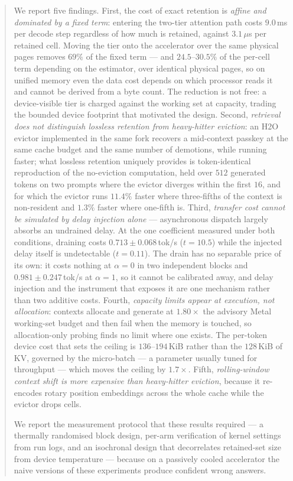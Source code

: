 \documentclass[manuscript,anonymous,review]{acmart}
\begin{document}
\begin{abstract}
We report five findings. First, the cost of exact retention is
\emph{affine and dominated by a fixed term}: entering the two-tier
attention path costs $9.0$\,ms per decode step regardless of how much
is retained, against $3.1\,\mu$s per retained cell. Moving the tier
onto the accelerator over the same physical pages removes $69\%$ of the
fixed term --- and $24.5$--$30.5\%$ of the per-cell term depending on
the estimator, over identical physical pages, so on unified memory even
the data cost depends on which processor reads it and cannot be derived
from a byte count. The reduction is not
free: a device-visible tier is charged against the working set at
capacity, trading the bounded device footprint that motivated the
design. Second, \emph{retrieval does not distinguish
lossless retention from heavy-hitter eviction}: an H2O evictor
implemented in the same fork recovers a mid-context passkey at the same cache
budget and the same number of demotions, while running faster; what
lossless retention uniquely provides is token-identical reproduction of
the no-eviction computation, held over $512$ generated tokens on two
prompts where the evictor diverges within the first $16$, and for which
the evictor runs $11.4\%$ faster
where three-fifths of the context is non-resident and $1.3\%$ faster
where one-fifth is. Third, \emph{transfer cost
cannot be simulated by delay injection alone} --- asynchronous
dispatch largely absorbs an undrained delay. At the one coefficient
measured under both conditions, draining costs $0.713 \pm 0.068$\,tok/s
($t = 10.5$) while the injected delay itself is undetectable
($t = 0.11$). The drain has no separable price of its own: it costs
nothing at $\alpha = 0$ in two independent blocks and $0.981 \pm
0.247$\,tok/s at $\alpha = 1$, so it cannot be calibrated away, and
delay injection and the instrument that exposes it are one mechanism
rather than two additive costs. Fourth, \emph{capacity limits appear
at execution, not allocation}: contexts allocate and generate at
$1.80\times$ the advisory Metal working-set budget and then fail when
the memory is touched, so allocation-only probing finds no limit where
one exists. The per-token device cost that sets the ceiling is
$136$--$194$\,KiB rather than the $128$\,KiB of KV, governed by the
micro-batch --- a parameter usually tuned for throughput --- which
moves the ceiling by $1.7\times$. Fifth, \emph{rolling-window context shift is more expensive
than heavy-hitter eviction}, because it re-encodes rotary position
embeddings across the whole cache while the evictor drops cells.

We report the measurement protocol that these results required --- a
thermally randomised block design, per-arm verification of kernel
settings from run logs, and an isochronal design that decorrelates
retained-set size from device temperature --- because on a passively
cooled accelerator the naive versions of these experiments produce
confident wrong answers.
\end{abstract}
\end{document}

